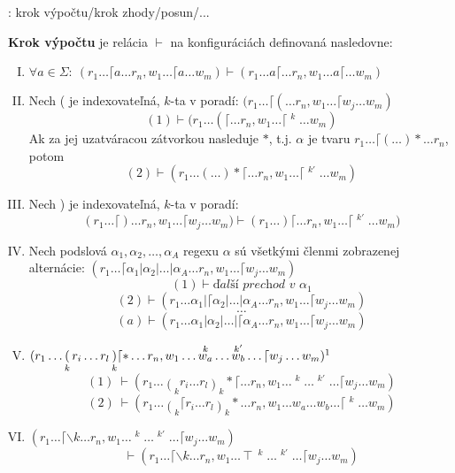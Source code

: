 \TODO: krok výpočtu/krok zhody/posun/...
\begin{df}
\textbf{Krok výpočtu} je relácia $\vdash$ na konfiguráciách definovaná nasledovne:

\begin{enumerate}[I.]\label{dfkonfig}
\item $\forall a \in \Sigma: ~(r_1 \dots \lceil a \dots r_n, w_1 \dots \lceil a \dots w_m) \vdash (r_1 \dots a\lceil \dots r_n, w_1 \dots a \lceil \dots w_m)$
\item Nech ( je indexovateľná, $k$-ta v poradí: $\displaystyle{ (r_1 \dots \lceil ( \dots r_n, w_1 \dots \lceil w_j \dots w_m)}$ $$(1) \vdash (r_1 \dots (\lceil \dots r_n, w_1 \dots \lceil \mathop{w_j}^k \dots w_m)$$
Ak za jej uzatváracou zátvorkou nasleduje $*$, t.j. $\alpha$ je tvaru $r_1 \dots \lceil ( \dots ) * \dots r_n$, potom $$ (2) \vdash (r_1 \dots (\dots )* \lceil \dots r_n, w_1 \dots \lceil \mathop{\mathop{w_j}^k}^{k'} \dots w_m ) $$
\item Nech ) je indexovateľná, $k$-ta v poradí: $$ (r_1 \dots \lceil ) \dots r_n, w_1 \dots \lceil w_j \dots w_m) \vdash (r_1 \dots )\lceil \dots r_n, w_1 \dots \lceil \mathop{w_j}^{k'} \dots w_m)$$
\item Nech podslová $\alpha_1, \alpha_2,\dots,\alpha_A$ regexu $\alpha$ sú všetkými členmi zobrazenej alternácie: $(r_1 \dots \lceil \alpha_1 | \alpha_2 | \dots | \alpha_A \dots r_n, w_1\dots \lceil w_j \dots w_m)$
$$(1) \vdash \textit{ďalší prechod v }\alpha_1$$
$$(2) \vdash (r_1 \dots \alpha_1 | \lceil \alpha_2 | \dots | \alpha_A \dots r_n, w_1\dots \lceil w_j \dots w_m)$$
$$\dots$$
$$(a) \vdash (r_1 \dots \alpha_1 | \alpha_2 | \dots | \lceil \alpha_A \dots r_n, w_1\dots \lceil w_j \dots w_m)$$
\item $\displaystyle{(r_1 \dots \mathop{(}_kr_i \dots r_l\mathop{)}_k\lceil * \dots r_n, w_1 \dots \mathop{w_a}^k \dots \mathop{w_b}^{k'} \dots \lceil w_j \dots w_m)\footnotemark}$
$$(1) ~\vdash(r_1 \dots \mathop{(}_kr_i \dots r_l\mathop{)}_k *\lceil \dots r_n, w_1 \dots \mathop{w_a}^k \dots \mathop{w_b}^{k'} \dots \lceil w_j \dots w_m)$$
$$(2) ~\vdash(r_1 \dots \mathop{(}_k\lceil r_i \dots r_l\mathop{)}_k * \dots r_n, w_1 \dots w_a \dots w_b \dots \lceil \mathop{w_j}^k \dots w_m)$$
\item $\displaystyle{(r_1 \dots \lceil \backslash k \dots r_n,w_1\dots\mathop{w_a}^k\dots\mathop{w_b}^{k'}\dots \lceil w_j\dots w_m)}$
$$\vdash(r_1 \dots \lceil \backslash k \dots r_n,w_1\ldots\intercal\mathop{w_a}^k \dots \mathop{w_b}^{k'} \dots \lceil w_j\dots w_m)$$	


\end{enumerate}
\end{df}
